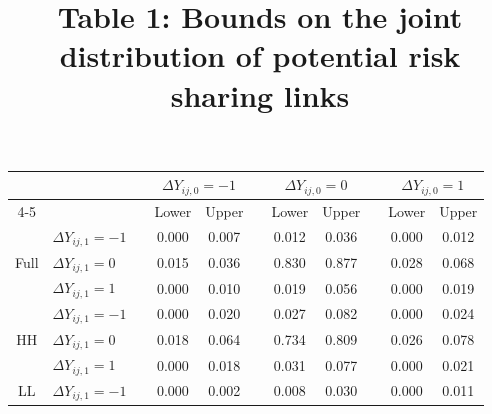 \documentclass[12pt]{article}
\theoremstyle{definition}
\begin{document}
\begin{table}[htbp]
	\vspace{5mm}
	\centering
		\title{Table 1: Bounds on the joint distribution of potential risk sharing links} \vspace{5mm}
    \begin{tabular}{clrcccccccc}\hline\hline
	&       &       & \multicolumn{2}{c}{$\Delta Y_{ij,0} = -1$} &       & \multicolumn{2}{c}{$\Delta Y_{ij,0} = 0$} &       & \multicolumn{2}{c}{$\Delta Y_{ij,0} = 1$} \\
	\cmidrule{4-5}\cmidrule{7-8}\cmidrule{10-11}          &       &       & Lower & Upper &       & Lower & Upper &       & Lower & Upper \\
	\midrule
	\multirow{3}[2]{*}{Full} & $\Delta Y_{ij,1} = -1$ &       & 0.000 & 0.007 &       & \textcolor[rgb]{ .753,  0,  0}{0.012} & \textcolor[rgb]{ .753,  0,  0}{0.036} &       & \textcolor[rgb]{ .753,  0,  0}{0.000} & \textcolor[rgb]{ .753,  0,  0}{0.012} \\
	& $\Delta Y_{ij,1} = 0$ &       & \textcolor[rgb]{ 0,  .439,  .753}{0.015} & \textcolor[rgb]{ 0,  .439,  .753}{0.036} &       & 0.830 & 0.877 &       & \textcolor[rgb]{ .753,  0,  0}{0.028} & \textcolor[rgb]{ .753,  0,  0}{0.068} \\
	& $\Delta Y_{ij,1} = 1$ &       & \textcolor[rgb]{ 0,  .439,  .753}{0.000} & \textcolor[rgb]{ 0,  .439,  .753}{0.010} &       & \textcolor[rgb]{ 0,  .439,  .753}{0.019} & \textcolor[rgb]{ 0,  .439,  .753}{0.056} &       & 0.000 & 0.019 \\
	\midrule
	\multirow{3}[2]{*}{HH} & $\Delta Y_{ij,1}= -1$ &       & 0.000 & 0.020 &       & \textcolor[rgb]{ .753,  0,  0}{0.027} & \textcolor[rgb]{ .753,  0,  0}{0.082} &       & \textcolor[rgb]{ .753,  0,  0}{0.000} & \textcolor[rgb]{ .753,  0,  0}{0.024} \\
	& $\Delta Y_{ij,1} = 0$ &       & \textcolor[rgb]{ 0,  .439,  .753}{0.018} & \textcolor[rgb]{ 0,  .439,  .753}{0.064} &       & 0.734 & 0.809 &       & \textcolor[rgb]{ .753,  0,  0}{0.026} & \textcolor[rgb]{ .753,  0,  0}{0.078} \\
	& $\Delta Y_{ij,1} = 1$ &       & \textcolor[rgb]{ 0,  .439,  .753}{0.000} & \textcolor[rgb]{ 0,  .439,  .753}{0.018} &       & \textcolor[rgb]{ 0,  .439,  .753}{0.031} & \textcolor[rgb]{ 0,  .439,  .753}{0.077} &       & 0.000 & 0.021 \\
	\midrule
	\multirow{3}[2]{*}{LL} & $\Delta Y_{ij,1} = -1$ &       & 0.000 & 0.002 &       & \textcolor[rgb]{ .753,  0,  0}{0.008} & \textcolor[rgb]{ .753,  0,  0}{0.030} &       & \textcolor[rgb]{ .753,  0,  0}{0.000} & \textcolor[rgb]{ .753,  0,  0}{0.011} \\

\end{tabular}
\end{table}
\end{document}
